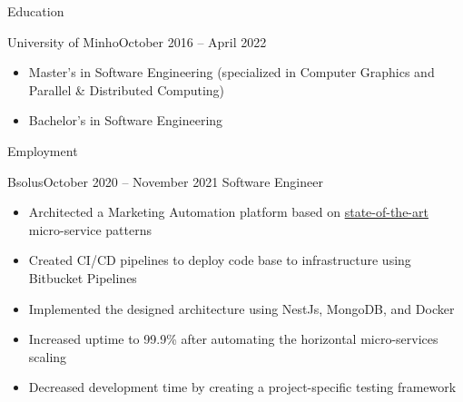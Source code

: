 \documentclass[]{mcdowellcv}
\begin{document}
	\makeheader
    
    \begin{cvsection}{Education}
		\begin{cvsubsection}{University of Minho}{}{October 2016 -- April 2022}
			\begin{itemize}
                \item Master’s in Software Engineering (specialized in Computer Graphics and Parallel \& Distributed Computing)
                \item Bachelor's in Software Engineering
			\end{itemize}
		\end{cvsubsection}
	\end{cvsection}
 
	\begin{cvsection}{Employment}
		\begin{cvsubsection}{Bsolus}{}{October 2020 -- November 2021}
			Software Engineer
			\begin{itemize}
                \item Architected a Marketing Automation platform based on \href{https://repositorium.sdum.uminho.pt/handle/1822/80045}{state-of-the-art} micro-service patterns
                \item Created CI/CD pipelines to deploy code base to infrastructure using Bitbucket Pipelines
                \item Implemented the designed architecture using NestJs, MongoDB, and Docker
                \item Increased uptime to 99.9\% after automating the horizontal micro-services scaling
                \item Decreased development time by creating a project-specific testing framework
			\end{itemize}
		\end{cvsubsection}
	\end{cvsection}
\end{document}
